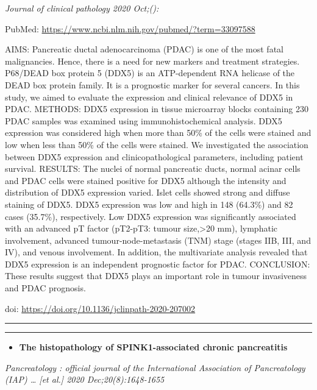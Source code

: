\documentclass[
]{article}
\providecommand{\tightlist}{%
  \setlength{\itemsep}{0pt}\setlength{\parskip}{0pt}}
\begin{document}
\emph{Journal of clinical pathology 2020 Oct;():}

PubMed: \url{https://www.ncbi.nlm.nih.gov/pubmed/?term=33097588}

AIMS: Pancreatic ductal adenocarcinoma (PDAC) is one of the most fatal
malignancies. Hence, there is a need for new markers and treatment
strategies. P68/DEAD box protein 5 (DDX5) is an ATP-dependent RNA
helicase of the DEAD box protein family. It is a prognostic marker for
several cancers. In this study, we aimed to evaluate the expression and
clinical relevance of DDX5 in PDAC. METHODS: DDX5 expression in tissue
microarray blocks containing 230 PDAC samples was examined using
immunohistochemical analysis. DDX5 expression was considered high when
more than 50\% of the cells were stained and low when less than 50\% of
the cells were stained. We investigated the association between DDX5
expression and clinicopathological parameters, including patient
survival. RESULTS: The nuclei of normal pancreatic ducts, normal acinar
cells and PDAC cells were stained positive for DDX5 although the
intensity and distribution of DDX5 expression varied. Islet cells showed
strong and diffuse staining of DDX5. DDX5 expression was low and high in
148 (64.3\%) and 82 cases (35.7\%), respectively. Low DDX5 expression
was significantly associated with an advanced pT factor (pT2-pT3: tumour
size,\textgreater20 mm), lymphatic involvement, advanced
tumour-node-metastasis (TNM) stage (stages IIB, III, and IV), and venous
involvement. In addition, the multivariate analysis revealed that DDX5
expression is an independent prognostic factor for PDAC. CONCLUSION:
These results suggest that DDX5 plays an important role in tumour
invasiveness and PDAC prognosis.

doi: \url{https://doi.org/10.1136/jclinpath-2020-207002}

\begin{center}\rule{0.5\linewidth}{0.5pt}\end{center}

\begin{center}\rule{0.5\linewidth}{0.5pt}\end{center}

\begin{itemize}
\tightlist
\item
  \textbf{The histopathology of SPINK1-associated chronic pancreatitis}
\end{itemize}

\emph{Pancreatology : official journal of the International Association
of Pancreatology (IAP) \ldots{} {[}et al.{]} 2020 Dec;20(8):1648-1655}
\end{document}
